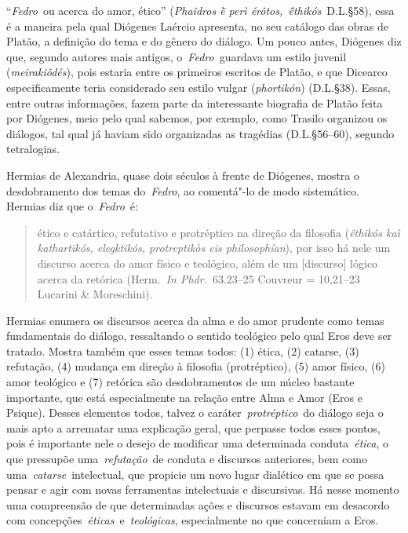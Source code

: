  
 

``\emph{Fedro}~ou acerca do amor, ético'' (\emph{Phaîdros ḕ perì
érôtos,~ḗthikós}~D.L.§58), essa é a maneira pela qual Diógenes Laércio
apresenta, no seu catálogo das obras de Platão, a definição do tema e do
gênero do diálogo. Um pouco antes, Diógenes diz que, segundo autores mais
antigos, o~\emph{Fedro}~guardava um estilo juvenil (\emph{meirakiôdés}),
pois estaria entre os primeiros escritos de Platão, e que Dicearco
especificamente teria considerado seu estilo vulgar (\emph{phortikón})
(D.L.§38). Essas, entre outras informações, fazem parte da interessante
biografia de Platão feita por Diógenes, meio pelo qual sabemos, por
exemplo, como Trasilo organizou os diálogos, tal qual já haviam sido
organizadas as tragédias (D.L.§56--60), segundo tetralogias.

Hermias de Alexandria, quase dois séculos à frente de Diógenes, mostra o
desdobramento dos temas do~\emph{Fedro}, ao comentá"-lo de modo
sistemático. Hermias diz que o~\emph{Fedro}~é:

 

\begin{quote}
\redondo{[…]} ético e catártico, refutativo e protréptico na direção da
filosofia (\emph{êthikós kaì kathartikós, elegktikós, protreptikòs eis
philosophían}), por isso há nele um discurso acerca do amor físico e
teológico, além de um [discurso] lógico acerca da retórica
(Herm.~\emph{In Phdr.}~63.23--25 Couvreur = 10,21--23 Lucarini \&
Moreschini).
\end{quote}

 

Hermias enumera os discursos acerca da alma e do amor prudente como
temas fundamentais do diálogo, ressaltando o sentido teológico pelo qual
Eros deve ser tratado. Mostra também que esses temas todos: (1) ética,
(2) catarse, (3) refutação, (4) mudança em direção à filosofia
(protréptico), (5) amor físico, (6) amor teológico e (7) retórica são
desdobramentos de um núcleo bastante importante, que está especialmente
na relação entre Alma e Amor (Eros e Psique). Desses elementos todos,
talvez o caráter~\emph{protréptico}~do diálogo seja o mais apto a
arrematar uma explicação geral, que perpasse todos esses pontos, pois é
importante nele o desejo de modificar uma determinada
conduta~\emph{ética}, o que pressupõe uma~\emph{refutação}~de conduta e
discursos anteriores, bem como uma~\emph{catarse}~intelectual, que
propicie um novo lugar dialético em que se possa pensar e agir com novas
ferramentas intelectuais e discursivas. Há nesse momento uma compreensão
de que determinadas ações e discursos estavam em desacordo com
concepções~\emph{éticas}~e~\emph{teológicas}, especialmente no que
concerniam a Eros.


